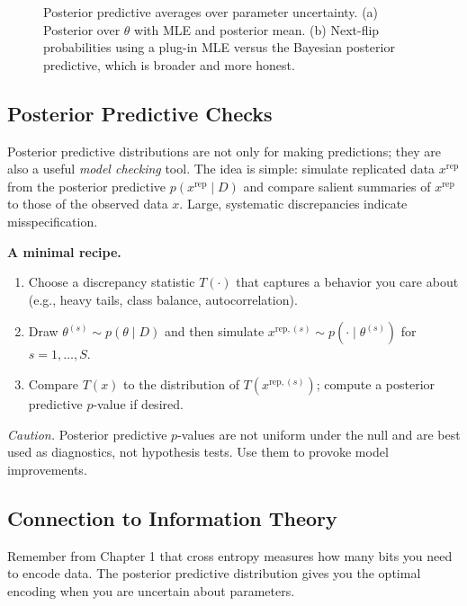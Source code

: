 \begin{figure}[t]
\centering

\caption{Posterior predictive averages over parameter uncertainty. (a) Posterior over $\theta$ with MLE and posterior mean. (b) Next-flip probabilities using a plug-in MLE versus the Bayesian posterior predictive, which is broader and more honest.}
\label{fig:posterior_predictive}
\end{figure}

\vspace{1.5em}

\subsection{Posterior Predictive Checks}

Posterior predictive distributions are not only for making predictions; they are also a useful \emph{model checking} tool. The idea is simple:
simulate replicated data $x^{\text{rep}}$ from the posterior predictive $p(x^{\text{rep}}\mid D)$ and compare salient summaries of $x^{\text{rep}}$ to those of the observed data $x$. Large, systematic discrepancies indicate misspecification.

\vspace{0.5em}
\noindent\textbf{A minimal recipe.}

\begin{enumerate}
\item Choose a discrepancy statistic $T(\cdot)$ that captures a behavior you care about (e.g., heavy tails, class balance, autocorrelation).
\item Draw $\theta^{(s)}\sim p(\theta\mid D)$ and then simulate $x^{\text{rep},(s)}\sim p(\cdot\mid \theta^{(s)})$ for $s=1,\ldots,S$.
\item Compare $T(x)$ to the distribution of $T(x^{\text{rep},(s)})$; compute a posterior predictive $p$-value if desired.
\end{enumerate}

\noindent\textit{Caution.} Posterior predictive $p$-values are not uniform under the null and are best used as diagnostics, not hypothesis tests. Use them to provoke model improvements.


\subsection{Connection to Information Theory}

Remember from Chapter 1 that cross entropy measures how many bits you need to encode data. The posterior predictive distribution gives you the optimal encoding when you are uncertain about parameters.

